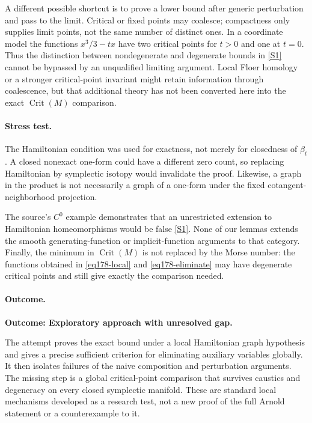 \documentclass[11pt,a4paper]{article}
\newcommand{\sref}[2]{\hyperlink{source:#1:#2}{[S#2]}}
\numberwithin{equation}{section}
\begin{document}
A different possible shortcut is to prove a lower bound after generic
perturbation and pass to the limit. Critical or fixed points may coalesce;
compactness only supplies limit points, not the same number of distinct
ones. In a coordinate model the functions
$x^3/3-tx$ have two critical points for $t>0$ and one at $t=0$.
Thus the distinction between nondegenerate and degenerate bounds in
\sref{30006772}{1} cannot be bypassed by an unqualified limiting argument.
Local Floer homology or a stronger critical-point invariant might retain
information through coalescence, but that additional theory has not been
converted here into the exact $\operatorname{Crit}(M)$ comparison.

\paragraph{Stress test.}
The Hamiltonian condition was used for exactness, not merely for closedness
of $\beta_t$. A closed nonexact one-form could have a different zero count,
so replacing Hamiltonian by symplectic isotopy would invalidate the proof.
Likewise, a graph in the product is not necessarily a graph of a one-form
under the fixed cotangent-neighborhood projection.

The source's $C^0$ example demonstrates that an unrestricted extension to
Hamiltonian homeomorphisms would be false \sref{30006772}{1}. None of our lemmas
extends the smooth generating-function or implicit-function arguments to
that category. Finally, the minimum in $\operatorname{Crit}(M)$ is not
replaced by the Morse number: the functions obtained in
\eqref{eq178-local} and \eqref{eq178-eliminate} may have degenerate
critical points and still give exactly the comparison needed.

\paragraph{Outcome.}
\textbf{Outcome: Exploratory approach with unresolved gap.}

The attempt proves the exact bound under a local Hamiltonian graph
hypothesis and gives a precise sufficient criterion for eliminating
auxiliary variables globally. It then isolates failures of the naive
composition and perturbation arguments. The missing step is a global
critical-point comparison that survives caustics and degeneracy on every
closed symplectic manifold. These are standard local mechanisms developed
as a research test, not a new proof of the full Arnold statement or a
counterexample to it.
\end{document}
